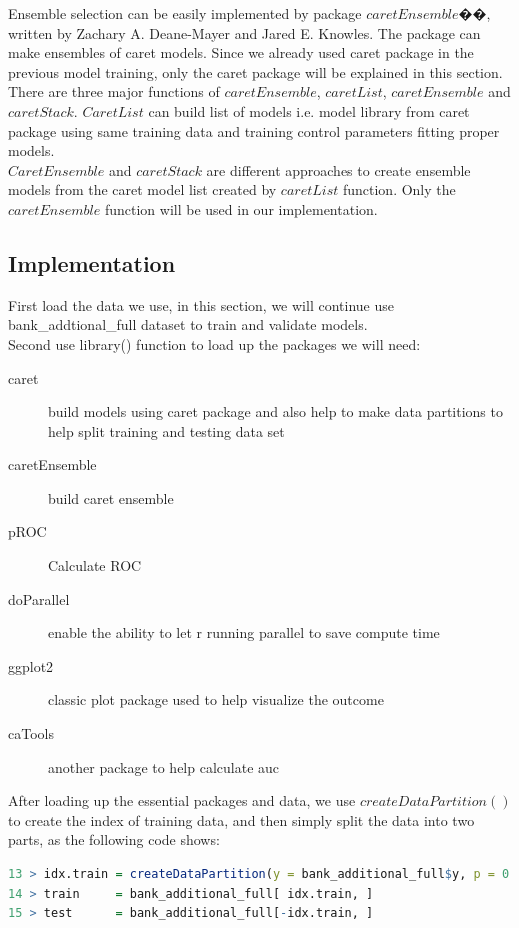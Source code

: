 \documentclass[12pt, a4paper, bibliography=totoc, english]{scrartcl}
\begin{document}
Ensemble selection can be easily implemented by package $caretEnsemble$��, written by Zachary A. Deane-Mayer and Jared E. Knowles. The package can make ensembles of caret models. Since we already used caret package in the previous model training, only the caret package will be explained in this section.\\
There are three major functions of $caretEnsemble$, $caretList$, $caretEnsemble$ and $caretStack$. 
$CaretList$ can build list of models i.e. model library from caret package using same training data and training control parameters fitting proper models.\\
$CaretEnsemble$ and $caretStack$ are different approaches to create ensemble models from the caret model list created by $caretList$ function. Only the $caretEnsemble$ function will be used in our implementation.

\subsection{Implementation}
First load the data we use, in this section, we will continue use bank\_addtional\_full dataset to train and validate models. \\
Second use library() function to load up the packages we will need: 
\begin{description}
	\item[caret] build models using caret package and also help to make data partitions to help split training and testing data set
	\item[caretEnsemble] build caret ensemble
	\item [pROC] Calculate ROC
	\item [doParallel] enable the ability to let r running parallel to save compute time
	\item [ggplot2] classic plot package used to help visualize the outcome
	\item [caTools] another package to help calculate auc
\end{description}
After loading up the essential packages and data, we use $createDataPartition()$ to create the index of training data, and then simply split the data into two parts, as the following code shows:
\begin{lstlisting}[language = R]
13 > idx.train = createDataPartition(y = bank_additional_full$y, p = 0.8, list = FALSE)
14 > train     = bank_additional_full[ idx.train, ]
15 > test      = bank_additional_full[-idx.train, ]
\end{lstlisting}
\end{document}
